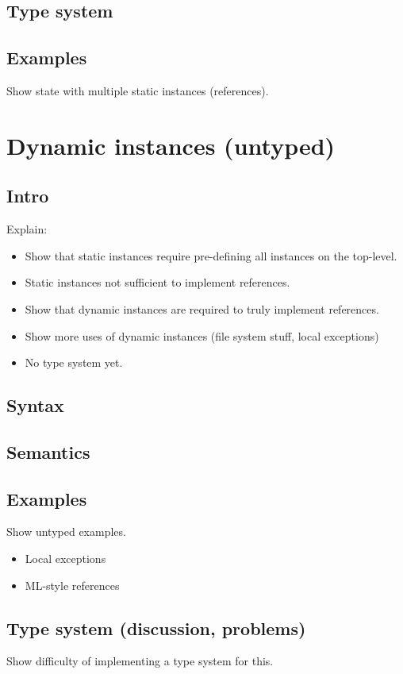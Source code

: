 {\subsection{Type system}

\subsection{Examples}
Show state with multiple static instances (references).

\newpage
\section{Dynamic instances (untyped)} \label{section:dynamicinst}

\subsection{Intro}
Explain:
\begin{itemize}
	\item Show that static instances require pre-defining all instances on the top-level.
	\item Static instances not sufficient to implement references.
	\item Show that dynamic instances are required to truly implement references.
	\item Show more uses of dynamic instances (file system stuff, local exceptions)
	\item No type system yet.
\end{itemize}

\subsection{Syntax}

\subsection{Semantics}

\subsection{Examples}
Show untyped examples.
\begin{itemize}
	\item Local exceptions
	\item ML-style references
\end{itemize}

\subsection{Type system (discussion, problems)}
Show difficulty of implementing a type system for this.
}